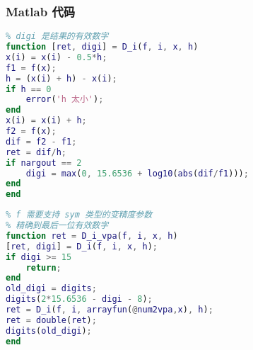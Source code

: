 \subsubsection{Matlab 代码}
\begin{lstlisting}[language=matlab, caption=D\_i.m]
% 数值偏偏导
% digi 是结果的有效数字
function [ret, digi] = D_i(f, i, x, h)
x(i) = x(i) - 0.5*h;
f1 = f(x);
h = (x(i) + h) - x(i);
if h == 0
    error('h 太小');
end
x(i) = x(i) + h;
f2 = f(x);
dif = f2 - f1;
ret = dif/h;
if nargout == 2
    digi = max(0, 15.6536 + log10(abs(dif/f1)));
end
end
\end{lstlisting}

\begin{lstlisting}[language=matlab, caption=D\_i\_vpa.m]
% 数值偏导 (变精度)
% f 需要支持 sym 类型的变精度参数
% 精确到最后一位有效数字
function ret = D_i_vpa(f, i, x, h)
[ret, digi] = D_i(f, i, x, h);
if digi >= 15
    return;
end
old_digi = digits;
digits(2*15.6536 - digi - 8);
ret = D_i(f, i, arrayfun(@num2vpa,x), h);
ret = double(ret);
digits(old_digi);
end
\end{lstlisting}
